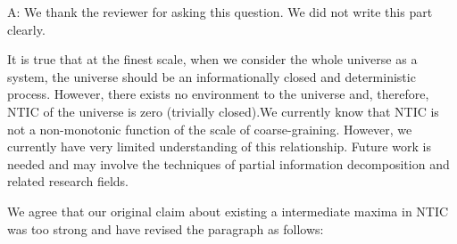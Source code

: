 \documentclass[utf8]{article}
\newenvironment{ans}  
    {\color{Black}\noindent A:}
    {~\newline}
\begin{document}
    	\begin{ans}
    	We thank the reviewer for asking this question. We did not write this part clearly. 
    	
    	It is true that at the finest scale, when we consider the whole universe as a system, the universe should be an informationally closed and deterministic process. However, there exists no environment to the universe and, therefore, NTIC of the universe is zero (trivially closed).We currently know that NTIC is not a non-monotonic function of the scale of coarse-graining. However, we currently have very limited understanding of this relationship. Future work is needed and may involve the techniques of partial information decomposition and related research fields. 
    	
		We agree that our original claim about existing a intermediate maxima in NTIC was too strong and have revised the paragraph as follows: 
    

\end{ans}
\end{document}
